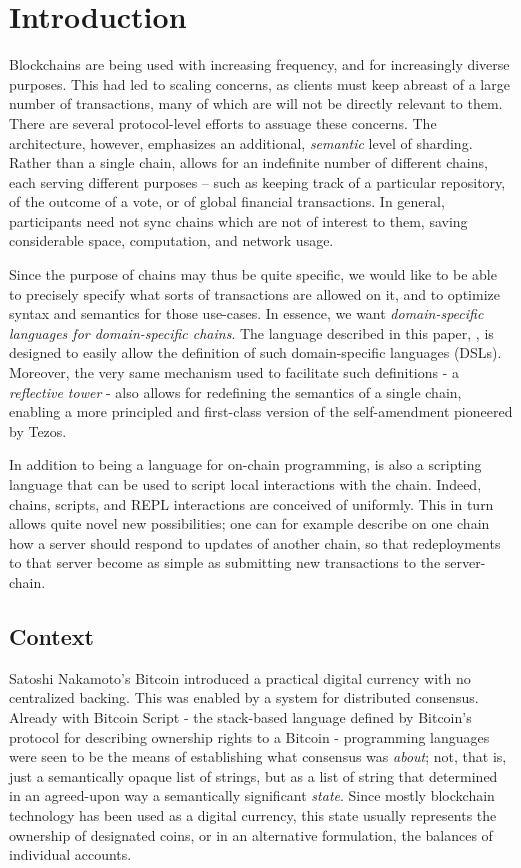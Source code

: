\section{Introduction}
\label{s:introduction}

Blockchains are being used with increasing frequency, and for increasingly
diverse purposes. This had led to scaling concerns, as clients must keep
abreast of a large number of transactions, many of which are will not be
directly relevant to them. There are several protocol-level efforts to assuage
these concerns. The \oscoin{} architecture, however, emphasizes an additional,
\textit{semantic} level of sharding. Rather than a single chain, \oscoin{}
allows for an indefinite number of different chains, each serving different
purposes -- such as keeping track of a particular repository, of the outcome of
a vote, or of global financial transactions. In general, participants need not
sync chains which are not of interest to them, saving considerable space,
computation, and network usage.

Since the purpose of chains may thus be quite specific, we would like to be
able to precisely specify what sorts of transactions are allowed on it, and to
optimize syntax and semantics for those use-cases. In essence, we want
\textit{domain-specific languages for domain-specific chains}. The language
described in this paper, \rad, is designed to easily allow the definition of
such domain-specific languages (DSLs). Moreover, the very same mechanism used to
facilitate such definitions - a \textit{reflective tower} - also
allows for redefining the semantics of a single chain, enabling a more
principled and first-class version of the self-amendment pioneered by
Tezos.\cite{Goodman2014}

In addition to being a language for on-chain programming, \rad is also a
scripting language that can be used to script local interactions with the
chain. Indeed, chains, scripts, and REPL interactions are conceived of
uniformly. This in turn allows quite novel new possibilities; one can for
example describe on one chain how a server should respond to updates of another
chain, so that redeployments to that server become as simple as submitting new
transactions to the server-chain.

\subsection{Context}

Satoshi Nakamoto's Bitcoin introduced a practical digital currency with no
centralized backing.\cite{Nakamoto2008} This was enabled by a system for
distributed consensus. Already with Bitcoin Script - the stack-based language
defined by Bitcoin's protocol for describing ownership rights to a Bitcoin -
programming languages were seen to be the means of establishing what consensus
was \textit{about}; not, that is, just a semantically opaque list of strings,
but as a list of string that determined in an agreed-upon way a semantically
significant \textit{state}. Since mostly blockchain technology has been used as
a digital currency, this state usually represents the ownership of designated
coins, or in an alternative formulation, the balances of individual accounts.

